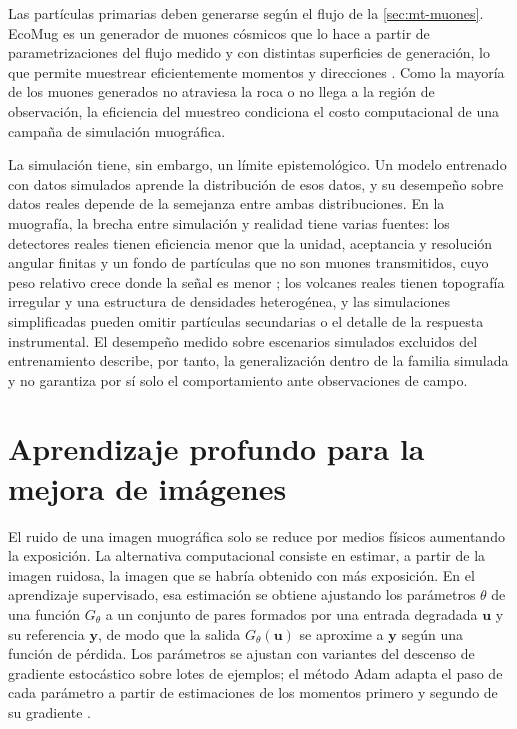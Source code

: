 Las partículas primarias deben generarse según el flujo de la \cref{sec:mt-muones}. EcoMug es un generador de muones cósmicos que lo hace a partir de parametrizaciones del flujo medido y con distintas superficies de generación, lo que permite muestrear eficientemente momentos y direcciones \parencite{pagano2021}. Como la mayoría de los muones generados no atraviesa la roca o no llega a la región de observación, la eficiencia del muestreo condiciona el costo computacional de una campaña de simulación muográfica.

La simulación tiene, sin embargo, un límite epistemológico. Un modelo entrenado con datos simulados aprende la distribución de esos datos, y su desempeño sobre datos reales depende de la semejanza entre ambas distribuciones. En la muografía, la brecha entre simulación y realidad tiene varias fuentes: los detectores reales tienen eficiencia menor que la unidad, aceptancia y resolución angular finitas y un fondo de partículas que no son muones transmitidos, cuyo peso relativo crece donde la señal es menor \parencite{lesparre2010,lechmann2021}; los volcanes reales tienen topografía irregular y una estructura de densidades heterogénea, y las simulaciones simplificadas pueden omitir partículas secundarias o el detalle de la respuesta instrumental. El desempeño medido sobre escenarios simulados excluidos del entrenamiento describe, por tanto, la generalización dentro de la familia simulada y no garantiza por sí solo el comportamiento ante observaciones de campo.

\section{Aprendizaje profundo para la mejora de imágenes}
\label{sec:mt-aprendizaje}

El ruido de una imagen muográfica solo se reduce por medios físicos aumentando la exposición. La alternativa computacional consiste en estimar, a partir de la imagen ruidosa, la imagen que se habría obtenido con más exposición. En el aprendizaje supervisado, esa estimación se obtiene ajustando los parámetros $\theta$ de una función $G_\theta$ a un conjunto de pares formados por una entrada degradada $\boldsymbol u$ y su referencia $\boldsymbol y$, de modo que la salida $G_\theta(\boldsymbol u)$ se aproxime a $\boldsymbol y$ según una función de pérdida. Los parámetros se ajustan con variantes del descenso de gradiente estocástico sobre lotes de ejemplos; el método Adam adapta el paso de cada parámetro a partir de estimaciones de los momentos primero y segundo de su gradiente \parencite{kingma2015}.

